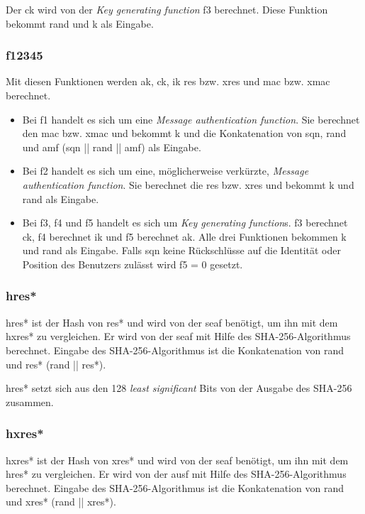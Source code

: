 Der \gls{ck} wird von der \textit{Key generating function} f3 berechnet.
Diese Funktion bekommt \gls{rand} und \gls{k} als Eingabe. %

\subsubsection{\gls{f12345}}
Mit diesen Funktionen werden \gls{ak}, \gls{ck}, \gls{ik} \gls{res} bzw. \gls{xres} und \gls{mac} bzw. \gls{xmac} berechnet. %
\begin{itemize}
\item Bei f1 handelt es sich um eine \textit{Message authentication function}.
Sie berechnet den \gls{mac} bzw. \gls{xmac} und bekommt \gls{k} und die Konkatenation von \gls{sqn}, \gls{rand} und \gls{amf} (\gls{sqn} || \gls{rand} || \gls{amf}) als Eingabe. \\
\item Bei f2 handelt es sich um eine, möglicherweise verkürzte, \textit{Message authentication function}.
Sie berechnet die \gls{res} bzw. \gls{xres} und bekommt \gls{k} und \gls{rand} als Eingabe.
\item Bei f3, f4 und f5 handelt es sich um \textit{Key generating function}s.
f3 berechnet \gls{ck}, f4 berechnet \gls{ik} und f5 berechnet \gls{ak}.
Alle drei Funktionen bekommen \gls{k} und \gls{rand} als Eingabe.
Falls \gls{sqn} keine Rückschlüsse auf die Identität oder Position des Benutzers zulässt wird f5 = 0 gesetzt.
\end{itemize}

\subsubsection{\gls{hres*}}
\gls{hres*} ist der Hash von \gls{res*} und wird von der \gls{seaf} benötigt, um ihn mit dem \gls{hxres*} zu vergleichen.
Er wird von der \gls{seaf} mit Hilfe des SHA-256-Algorithmus berechnet. %
Eingabe des SHA-256-Algorithmus ist die Konkatenation von \gls{rand} und \gls{res*} (\gls{rand} || \gls{res*}).

\gls{hres*} setzt sich aus den 128 \textit{least significant} Bits von der Ausgabe des SHA-256 zusammen.

\subsubsection{\gls{hxres*}}
\gls{hxres*} ist der Hash von \gls{xres*} und wird von der \gls{seaf} benötigt, um ihn mit dem \gls{hres*} zu vergleichen.
Er wird von der \gls{ausf} mit Hilfe des SHA-256-Algorithmus berechnet. %
Eingabe des SHA-256-Algorithmus ist die Konkatenation von \gls{rand} und \gls{xres*} (\gls{rand} || \gls{xres*}).

